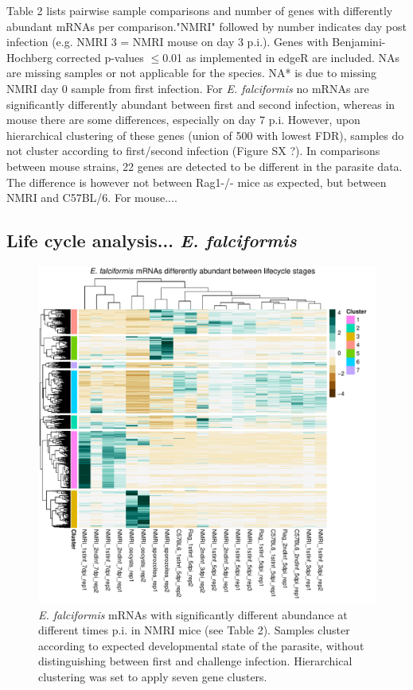 \documentclass{bmcart}
\begin{document}
Table 2 lists pairwise sample comparisons and number of genes with
differently abundant mRNAs per comparison."NMRI" followed by number
indicates day post infection (e.g. NMRI 3 = NMRI mouse on day 3
p.i.). Genes with Benjamini-Hochberg corrected p-values $\leq$0.01 as
implemented in edgeR are included. NAs are missing samples or not
applicable for the species. NA* is due to missing NMRI day 0 sample
from first infection. For \textit{E. falciformis} no mRNAs are
significantly differently abundant between first and second infection,
whereas in mouse there are some differences, especially on day 7
p.i. However, upon hierarchical clustering of these genes (union of
500 with lowest FDR), samples do not cluster according to first/second
infection (Figure SX ?). In comparisons between mouse strains, 22
genes are detected to be different in the parasite data. The
difference is however not between Rag1-/- mice as expected, but
between NMRI and C57BL/6. For mouse....


\clearpage
\subsection{Life cycle analysis... \textit{E. falciformis}}
\begin{figure}[h!]
	\includegraphics[width=\linewidth]{EfLifecycleHeatmap.pdf}  
	\caption{\textit{E. falciformis} mRNAs with significantly different abundance at different times p.i. in NMRI mice (see Table 2). Samples cluster according to expected developmental state of the parasite, without distinguishing between first and challenge infection. Hierarchical clustering was set to apply seven gene clusters.}
\end{figure}
\end{document}
